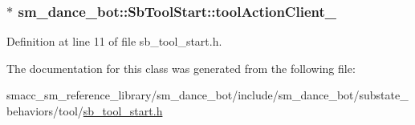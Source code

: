 \subsubsection[{\texorpdfstring{tool\+Action\+Client\+\_\+}{toolActionClient_}}]{$\ast$ sm\+\_\+dance\+\_\+bot\+::\+Sb\+Tool\+Start\+::tool\+Action\+Client\+\_\+}\hypertarget{classsm__dance__bot_1_1SbToolStart_ad15f128678ba29a7f07e9570ef4df7aa}{}\label{classsm__dance__bot_1_1SbToolStart_ad15f128678ba29a7f07e9570ef4df7aa}


Definition at line 11 of file sb\+\_\+tool\+\_\+start.\+h.



The documentation for this class was generated from the following file\+:\begin{DoxyCompactItemize}
\item 
smacc\+\_\+sm\+\_\+reference\+\_\+library/sm\+\_\+dance\+\_\+bot/include/sm\+\_\+dance\+\_\+bot/substate\+\_\+behaviors/tool/\hyperlink{sb__tool__start_8h}{sb\+\_\+tool\+\_\+start.\+h}\end{DoxyCompactItemize}
